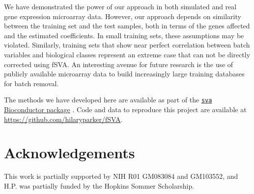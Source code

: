 \documentclass[letterpaper,12pt]{article}\usepackage[]{graphicx}\usepackage[]{color}
\begin{document}
We have demonstrated the power of our approach in both simulated and real gene expression microarray data. However, our approach depends on similarity between the training set and the test samples, both in terms of the genes affected and the estimated coefficients. In small training sets, these assumptions may be violated. Similarly, training sets that show near perfect correlation between batch variables and biological classes represent an extreme case that can not be directly corrected using fSVA. An interesting avenue for future research is the use of publicly available microarray data to build increasingly large training databases for batch removal. 

The methods we have developed here are available as part of the \href{http://www.bioconductor.org/packages/2.11/bioc/html/sva.html}{\texttt{sva} Bioconductor package} \citep{Leek2012b}. Code and data to reproduce this project are available at \url{https://github.com/hilaryparker/fSVA}.

\section{Acknowledgements}
This work is partially supported by NIH R01 GM083084 and GM103552, and H.P. was partially funded by the Hopkins Sommer Scholarship.




\end{document}
